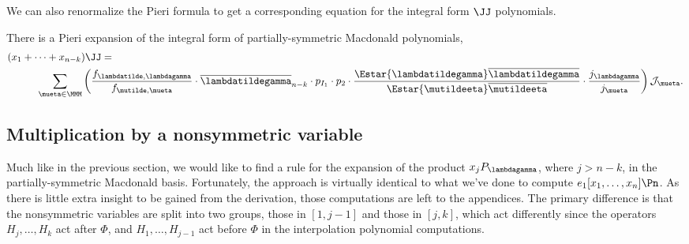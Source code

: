 We can also renormalize the Pieri formula to get a corresponding equation for the integral form $\JJ$ polynomials.

\begin{coro}\label{Jpieri}
 There is a Pieri expansion of the integral form of partially-symmetric Macdonald polynomials,
\begin{align*} &(x_1 + \dots + x_{n-k})\JJ = \\  & \hspace*{1cm}\sum_{\mueta \in \MMM} \left(  \frac{f_{\lambdatilde,\lambdagamma}}{f_{\mutilde,\mueta}} \cdot \overline{\lambdatildegamma}_{n-k} \cdot p_{I_1} \cdot p_{2}\cdot \frac{\Estar{\lambdatildegamma}\overline{\lambdatildegamma}}{\Estar{\mutildeeta}\overline{\mutildeeta}} \cdot \frac{ j_{\lambdagamma}}{j_{\mueta}} \right) \mathcal{J}_{\mueta}. \end{align*}
\end{coro}


    
\subsection{Multiplication by a nonsymmetric variable}

Much like in the previous section, we would like to find a rule for the expansion of the product $x_j P_\lambdagamma$, where $j>n-k$, in the partially-symmetric Macdonald basis. Fortunately, the approach is virtually identical to what we've done to compute $e_1[x_1, \dotsc, x_n] \Pn$. As there is little extra insight to be gained from the derivation, those computations are left to the appendices. The primary difference is that the nonsymmetric variables are split into two groups, those in $[1,j-1]$ and those in $[j,k]$, which act differently since the operators $H_j, \dotsc, H_k$ act after $\Phi$, and $H_1, \dotsc, H_{j-1}$ act before $\Phi$ in the interpolation polynomial computations.

